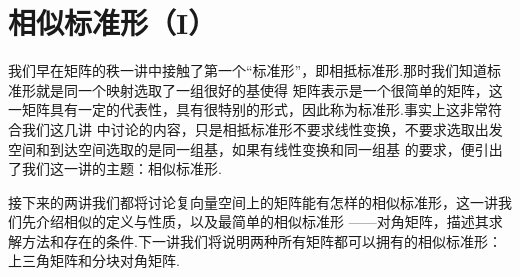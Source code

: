 \chapter{相似标准形（I）}

我们早在矩阵的秩一讲中接触了第一个``标准形''，即相抵标准形.那时我们知道标准形就是同一个映射选取了一组很好的基使得
矩阵表示是一个很简单的矩阵，这一矩阵具有一定的代表性，具有很特别的形式，因此称为标准形.事实上这非常符合我们这几讲
中讨论的内容，只是相抵标准形不要求线性变换，不要求选取出发空间和到达空间选取的是同一组基，如果有线性变换和同一组基
的要求，便引出了我们这一讲的主题：相似标准形.

接下来的两讲我们都将讨论复向量空间上的矩阵能有怎样的相似标准形，这一讲我们先介绍相似的定义与性质，以及最简单的相似标准形
——对角矩阵，描述其求解方法和存在的条件.下一讲我们将说明两种所有矩阵都可以拥有的相似标准形：上三角矩阵和分块对角矩阵.

